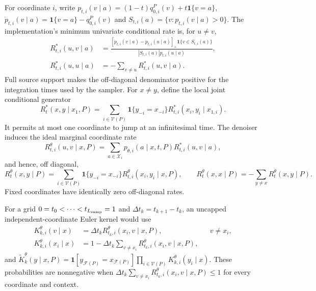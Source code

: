 \documentclass{article}
\begin{document}
For coordinate $i$, write
$p_{t,i}(v\mid a)=(1-t)q_{0,i}^P(v)+t\mathbf 1\{v=a\}$,
$\dot p_{t,i}(v\mid a)=\mathbf 1\{v=a\}-q_{0,i}^P(v)$ and
$S_{t,i}(a)=\{v:p_{t,i}(v\mid a)>0\}$. The implementation's minimum univariate conditional rate is,
for $u\neq v$,
\begin{align}
 R^*_{t,i}(u,v\mid a)
 &=
 \frac{[\dot p_{t,i}(v\mid a)-\dot p_{t,i}(u\mid a)]_+
 \mathbf 1\{v\in S_{t,i}(a)\}}
 {|S_{t,i}(a)|p_{t,i}(u\mid a)},\\
 R^*_{t,i}(u,u\mid a)
 &=-\sum_{v\neq u}R^*_{t,i}(u,v\mid a).
\end{align}
Full source support makes the off-diagonal denominator positive for the integration times used by
the sampler. For $x\neq y$, define the local joint
conditional generator
\begin{equation}
 R_t^*(x,y\mid x_1,P)=
 \sum_{i\in\mathcal V(P)}\mathbf 1\{y_{-i}=x_{-i}\}
 R^*_{t,i}(x_i,y_i\mid x_{1,i}).
\end{equation}
It permits at most one coordinate to jump at an infinitesimal time. The denoiser induces the ideal
marginal coordinate rate
\begin{equation}
 R_{t,i}^\theta(u,v\mid x,P)=
 \sum_{a\in\mathcal X_i}p_{\theta,i}(a\mid x,t,P)R^*_{t,i}(u,v\mid a),
\end{equation}
and hence, off diagonal,
\begin{equation}
 R_t^\theta(x,y\mid P)=
 \sum_{i\in\mathcal V(P)}\mathbf 1\{y_{-i}=x_{-i}\}
 R_{t,i}^\theta(x_i,y_i\mid x,P),
 \qquad
 R_t^\theta(x,x\mid P)=-\sum_{y\neq x}R_t^\theta(x,y\mid P).
\end{equation}
Fixed coordinates have identically zero off-diagonal rates.

For a grid $0=t_0<\cdots<t_{L_{\rm samp}}=1$ and
$\Delta t_k=t_{k+1}-t_k$, an uncapped independent-coordinate Euler kernel would use
\begin{align}
 K_{k,i}^\theta(v\mid x)
 &=\Delta t_k R_{t_k,i}^\theta(x_i,v\mid x,P), &&v\neq x_i,\\
 K_{k,i}^\theta(x_i\mid x)
 &=1-\Delta t_k\sum_{v\neq x_i}R_{t_k,i}^\theta(x_i,v\mid x,P),
\end{align}
and $\widetilde K_k^\theta(y\mid x,P)=
\mathbf 1[y_{\mathcal F(P)}=x_{\mathcal F(P)}]
\prod_{i\in\mathcal V(P)}K_{k,i}^\theta(y_i\mid x)$. These probabilities are nonnegative when
$\Delta t_k\sum_{v\neq x_i}R_{t_k,i}^\theta(x_i,v\mid x,P)\leq1$ for every coordinate and context.
\end{document}
